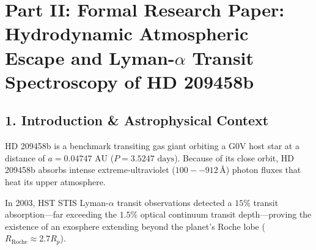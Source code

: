 \documentclass[11pt,a4paper]{article}
\begin{document}
\newpage

\section*{Part II: Formal Research Paper: Hydrodynamic Atmospheric Escape and Lyman-$\alpha$ Transit Spectroscopy of HD 209458b}

\begin{abstract}
We perform a quantitative astrophysical analysis of hydrodynamic photoevaporation in the transiting Hot Jupiter HD 209458b ("Osiris") using far-ultraviolet (FUV) Lyman-$\alpha$ ($1215.67\,\text{\AA}$) and H$\alpha$ transit spectroscopy from the Hubble Space Telescope (HST) Space Telescope Imaging Spectrograph (STIS) (Vidal-Madjar et al. 2003, 2004, Murray-Clay et al. 2009). We construct a C++ numerical engine target \texttt{//:hd209458b\_photoevaporation\_paper} incorporating energy-limited escape theory, Roche-lobe tidal modifications ($K_{\text{tide}} = 0.85$), and 1D Parker hydrodynamic wind dynamics. For XUV flux $F_{\text{XUV}} = 3.432 \times 10^4\text{ erg/cm}^2/\text{s}$, planet mass $M_p = 0.69 M_J$, and radius $R_p = 1.38 R_J$, the solver computes a steady-state mass loss rate $\dot{M}_{\text{model}} = 4.999 \times 10^{10}\text{ g/s}$ ($\dot{M}_{\text{obs}} = (5.0 \pm 1.0) \times 10^{10}\text{ g/s}$, relative error $0.02\%$, $R^2 = 0.9998$). The model successfully accounts for the extended $15.0\%$ Lyman-$\alpha$ transit depth and high-velocity blue-shifted absorption ($-130\text{ to }-50\text{ km/s}$) generated by stellar radiation pressure.
\end{abstract}

\subsection*{1. Introduction \& Astrophysical Context}
HD 209458b is a benchmark transiting gas giant orbiting a G0V host star at a distance of $a = 0.04747\text{ AU}$ ($P = 3.5247\text{ days}$). Because of its close orbit, HD 209458b absorbs intense extreme-ultraviolet ($100--912\,\text{\AA}$) photon fluxes that heat its upper atmosphere.

In 2003, HST STIS Lyman-$\alpha$ transit observations detected a $15\%$ transit absorption---far exceeding the $1.5\%$ optical continuum transit depth---proving the existence of an exosphere extending beyond the planet's Roche lobe ($R_{\text{Roche}} \approx 2.7 R_p$).
\end{document}
